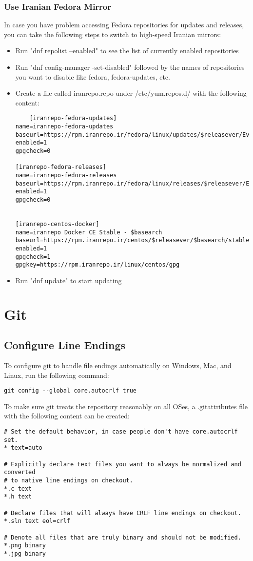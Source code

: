 \documentclass{article}
\begin{document}
\subsubsection{Use Iranian Fedora Mirror}
In case you have problem accessing Fedora repositories for updates and releases, you can take the following steps to switch to high-speed Iranian mirrors:  

\begin{itemize}
	\item Run "dnf repolist --enabled" to see the list of currently enabled repositories
	\item Run "dnf config-manager -set-disabled" followed by the names of repositories you want to disable like fedora, fedora-updates, etc.
	\item Create a file called iranrepo.repo under /etc/yum.repos.d/ with the following content: 
	\begin{lstlisting}
	[iranrepo-fedora-updates]
name=iranrepo-fedora-updates
baseurl=https://rpm.iranrepo.ir/fedora/linux/updates/$releasever/Everything/$basearch/
enabled=1
gpgcheck=0

[iranrepo-fedora-releases]
name=iranrepo-fedora-releases
baseurl=https://rpm.iranrepo.ir/fedora/linux/releases/$releasever/Everything/$basearch/
enabled=1
gpgcheck=0


[iranrepo-centos-docker]
name=iranrepo Docker CE Stable - $basearch
baseurl=https://rpm.iranrepo.ir/centos/$releasever/$basearch/stable
enabled=1
gpgcheck=1
gpgkey=https://rpm.iranrepo.ir/linux/centos/gpg
	\end{lstlisting}
	\item Run "dnf update" to start updating
\end{itemize}

\section{Git}
\subsection{Configure Line Endings}
To configure git to handle file endings automatically on Windows, Mac, and Linux, run the following command:
\begin{verbatim}
git config --global core.autocrlf true
\end{verbatim}
To make sure git treats the repository reasonably on all OSes, a .gitattributes file with the following content can be created:
\begin{verbatim}
# Set the default behavior, in case people don't have core.autocrlf set.
* text=auto

# Explicitly declare text files you want to always be normalized and converted
# to native line endings on checkout.
*.c text
*.h text

# Declare files that will always have CRLF line endings on checkout.
*.sln text eol=crlf

# Denote all files that are truly binary and should not be modified.
*.png binary
*.jpg binary
\end{verbatim}
\end{document}
